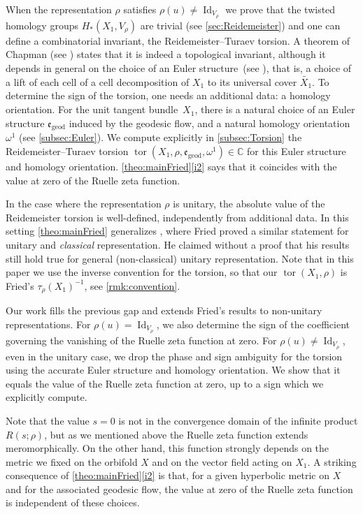 \documentclass[10pt]{amsart}
\theoremstyle{plain}
\theoremstyle{definition}
\theoremstyle{remark}
\newcommand{\C}{\mathbb{C}}
\newcommand{\geod}{\mathrm{geod}}
\DeclareMathOperator{\Id}{Id}
\numberwithin{equation}{section}
\DeclareMathOperator{\tor}{tor}
\begin{document}
When the representation $\rho$ satisfies $\rho(u) \neq\Id_{V_\rho}$ we prove that the twisted homology groups $H_*(X_1, V_\rho)$ are trivial (see \cref{sec:Reidemeister}) and one can define a combinatorial invariant, the Reidemeister--Turaev torsion. A theorem of Chapman (see \cite[Th.\,1]{Chapman}) states that it is indeed a topological invariant, although it depends in general on the choice of an Euler structure~(see \cite{Turaev_book}), that is, a choice of a lift of each cell of a cell decomposition of $X_1$ to its universal cover $\widetilde{X_1}$. To determine the sign of the torsion, one needs an additional data: a homology orientation. For the unit tangent bundle~$X_1$, there is a natural choice of an Euler structure $\mathfrak e_{\geod}$ induced by the geodesic flow, and a natural homology orientation $\omega^1$ (see \cref{subsec:Euler}). We compute explicitly in \cref{subsec:Torsion} the Reidemeister--Turaev torsion $\tor(X_1, \rho, \mathfrak e_{\geod}, \omega^1) \in \C$ for this Euler structure and homology orientation. \cref{theo:mainFried}\eqref{i2} says that it coincides with the value at zero of the Ruelle zeta function.

In the case where the representation $\rho$ is unitary, the absolute value of the Reidemeister torsion is well-defined, independently from additional data. In this setting \cref{theo:mainFried} generalizes \cite[Th.\,2 \& 3]{fried1986fuchsian}, where Fried proved a similar statement for unitary and \emph{classical} representation. He claimed without a proof that his results still hold true for general (non-classical) unitary representation. Note that in this paper we use the inverse convention for the torsion, so that our $\tor(X_1, \rho)$ is Fried's $\tau_\rho(X_1)^{-1}$, see \cref{rmk:convention}.

Our work fills the previous gap and extends Fried's results to non-unitary representations. For $\rho(u)=\Id_{V_\rho}$, we also determine the sign of the coefficient governing the vanishing of the Ruelle zeta function at zero. For $\rho(u) \neq \Id_{V_\rho}$, even in the unitary case, we drop the phase and sign ambiguity for the torsion using the accurate Euler structure and homology orientation. We show that it equals the value of the Ruelle zeta function at zero, up to a sign which we explicitly compute.

Note that the value $s=0$ is not in the convergence domain of the infinite product $R(s; \rho)$, but as we mentioned above the Ruelle zeta function extends meromorphically. On the other hand, this function strongly depends on the metric we fixed on the orbifold $X$ and on the vector field acting on $X_1$. A striking consequence of \cref{theo:mainFried}\eqref{i2} is that, for a given hyperbolic metric on $X$ and for the associated geodesic flow, the value at zero of the Ruelle zeta function is independent of these choices.
\end{document}
